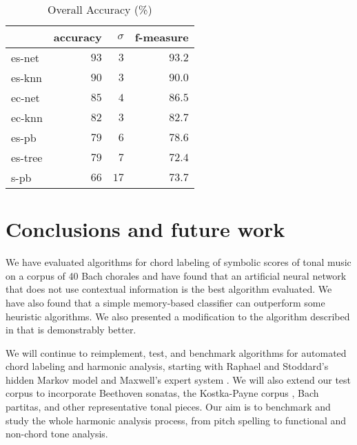 \documentclass{article}
\begin{document}
\begin{table}
  \centering
  \begin{tabular}{l|rrr}
       & accuracy& $\sigma$  & f-measure\\
\hline
es-net &$   93  $&$  3$      &$93.2$ \\
es-knn &$   90  $&$  3$      &$90.0$ \\
ec-net &$   85  $&$  4$      &$86.5$ \\
ec-knn &$   82  $&$  3$      &$82.7$ \\
es-pb  &$   79  $&$  6$      &$78.6$ \\
es-tree&$   79  $&$  7$      &$72.4$ \\
s-pb   &$   66  $&$ 17$      &$73.7$ \\

  \end{tabular}                                                        


  \caption{Overall Accuracy (\%)}
  \label{tab:accuracy}
\end{table}

\section{Conclusions and future work}
\label{sec:conclusions}

We have evaluated algorithms for chord labeling of symbolic scores of
tonal music on a corpus of 40 Bach chorales and have found that an
artificial neural network that does not use contextual information is
the best algorithm evaluated. We have also found that a simple
memory-based classifier can outperform some heuristic algorithms. We
also presented a modification to the algorithm described in
\cite{pardo.ea:algorithms} that is demonstrably better.

We will continue to reimplement, test, and benchmark algorithms for
automated chord labeling and harmonic analysis, starting with Raphael
and Stoddard's hidden Markov model \cite{raphael.ea:harmonic} and
Maxwell's expert system \cite{maxwell:expert}.  We will also extend
our test corpus to incorporate Beethoven sonatas, the Kostka-Payne
corpus \cite{temperley:bayesian}, Bach partitas, and other
representative tonal pieces. Our aim is to benchmark and study the
whole harmonic analysis process, from pitch spelling to functional and
non-chord tone analysis.



\end{document}
